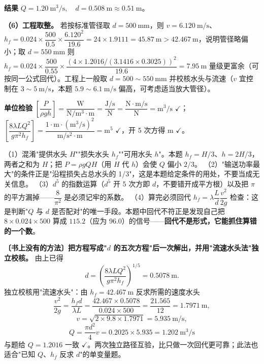\begin{jie}
\textbf{结果} $\boxed{Q=1.20\ \mathrm{m^3/s},\quad d=0.508\ \mathrm{m}\approx0.51\ \mathrm{m}}$。

\textbf{（6）工程取整。} 若按标准管径取 $d=500\ \mathrm{mm}$，则 $v=6.120\ \mathrm{m/s}$、$h_f=0.024\times\dfrac{500}{0.5}\times\dfrac{6.120^2}{19.6}=24\times1.9111=45.87\ \mathrm{m}>42.467\ \mathrm{m}$，说明管径略偏小；取 $d=550\ \mathrm{mm}$ 则 $h_f=0.024\times\dfrac{500}{0.55}\times\dfrac{(4\times1.2016/(3.1416\times0.3025))^2}{19.6}=7.95\ \mathrm{m}$ 量级更富余（可按同一公式回代）。工程上一般取 $d=500\sim550\ \mathrm{mm}$ 并校核水头与流速（$v$ 宜控制在 $3\sim5\ \mathrm{m/s}$，本题 $5.9\sim6.1\ \mathrm{m/s}$ 偏高，可考虑适当放大管径）。

\textbf{单位检验} $\left[\dfrac{P}{\rho gh}\right]=\dfrac{\mathrm{W}}{\mathrm{N/m^3}\cdot\mathrm{m}}=\dfrac{\mathrm{J/s}}{\mathrm{N}}=\dfrac{\mathrm{N\cdot m/s}}{\mathrm{N}}=\mathrm{m^3/s}$ $\checkmark$；
$\left[\dfrac{8\lambda LQ^2}{g\pi^2h_f}\right]=\dfrac{1\cdot\mathrm{m}\cdot(\mathrm{m^3/s})^2}{\mathrm{m/s^2}\cdot\mathrm{m}}=\mathrm{m^5}$ $\checkmark$，开 5 次方得 $\mathrm{m}$ $\checkmark$。
\end{jie}
\begin{yicuo}
（1）混淆"提供水头 $H$""损失水头 $h_f$""可用水头 $h$"。本题 $h_f=H/3$、$h=2H/3$，两者之和为 $H$；把 $P=\rho gQH$（用 $H$ 代 $h$）会使 $Q$ 偏小 $2/3$。
（2）"输送功率最大"的条件正是"沿程损失占总水头的 1/3"，这是本题给定条件的用处，不要当成无关信息。
（3）$d^5$ 的指数运算（$d^5$ 开 5 次方即 $d$，不要错开成平方根）以及把 $\pi$ 的平方漏掉——$\dfrac{8}{\pi^2}$ 是必须记牢的系数。
（4）算完必须回代 $h_f=\lambda\dfrac{L}{d}\dfrac{v^2}{2g}$ 检查：这是判断"$Q$ 与 $d$ 是否配对"的唯一手段。本题中回代不符正是发现自己把 $8\times0.024\times500$ 算成 $115.2$（应为 96.0）的信号——\textbf{回代不是形式，它能抓住算错的一个数}。
\end{yicuo}
\begin{banfa}
\textbf{〔书上没有的方法〕把方程写成"$d$ 的五次方程"后一次解出，并用"流速水头法"独立校核。} 由上已得
\[d=\left(\frac{8\lambda LQ^2}{g\pi^2h_f}\right)^{1/5}=0.5078\ \mathrm{m}.\]
独立校核用"流速水头"：由 $h_f=42.467\ \mathrm{m}$ 反求所需的速度水头
\[\frac{v^2}{2g}=\frac{h_f d}{\lambda L}=\frac{42.467\times0.5078}{0.024\times500}=\frac{21.565}{12}=1.7971\ \mathrm{m},\]
\[v=\sqrt{2\times9.8\times1.7971}=5.935\ \mathrm{m/s},\]
\[Q=\frac{\pi d^2}{4}v=0.2025\times5.935=1.202\ \mathrm{m^3/s}\]
与题给 $Q=1.2016$ 一致 $\checkmark$。两次独立路径互验，比只做一次回代更可靠；此法也适合"已知 $Q$、$h_f$ 反求 $d$"的单变量题。
\end{banfa}

